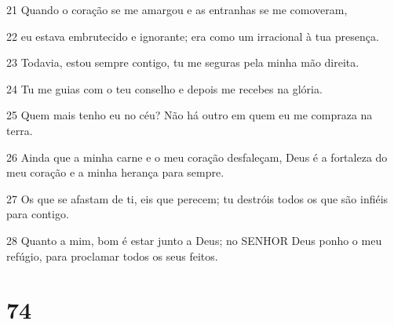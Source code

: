 \par 21 Quando o coração se me amargou e as entranhas se me comoveram,
\par 22 eu estava embrutecido e ignorante; era como um irracional à tua presença.
\par 23 Todavia, estou sempre contigo, tu me seguras pela minha mão direita.
\par 24 Tu me guias com o teu conselho e depois me recebes na glória.
\par 25 Quem mais tenho eu no céu? Não há outro em quem eu me compraza na terra.
\par 26 Ainda que a minha carne e o meu coração desfaleçam, Deus é a fortaleza do meu coração e a minha herança para sempre.
\par 27 Os que se afastam de ti, eis que perecem; tu destróis todos os que são infiéis para contigo.
\par 28 Quanto a mim, bom é estar junto a Deus; no SENHOR Deus ponho o meu refúgio, para proclamar todos os seus feitos.

\chapter{74}

